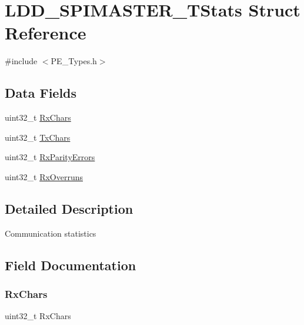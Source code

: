 \hypertarget{struct_l_d_d___s_p_i_m_a_s_t_e_r___t_stats}{}\section{L\+D\+D\+\_\+\+S\+P\+I\+M\+A\+S\+T\+E\+R\+\_\+\+T\+Stats Struct Reference}
\label{struct_l_d_d___s_p_i_m_a_s_t_e_r___t_stats}


{\ttfamily \#include $<$P\+E\+\_\+\+Types.\+h$>$}

\subsection*{Data Fields}
\begin{DoxyCompactItemize}
\item 
uint32\+\_\+t \hyperlink{struct_l_d_d___s_p_i_m_a_s_t_e_r___t_stats_a95ff5c4048db62e6b700f6060c77c523}{Rx\+Chars}
\item 
uint32\+\_\+t \hyperlink{struct_l_d_d___s_p_i_m_a_s_t_e_r___t_stats_a13ec7f90be6f667d1b98595eb709ccc7}{Tx\+Chars}
\item 
uint32\+\_\+t \hyperlink{struct_l_d_d___s_p_i_m_a_s_t_e_r___t_stats_a30956a47d75d5c7305f1f9f7c0d70621}{Rx\+Parity\+Errors}
\item 
uint32\+\_\+t \hyperlink{struct_l_d_d___s_p_i_m_a_s_t_e_r___t_stats_a45862235648738550a10ad79292ef50c}{Rx\+Overruns}
\end{DoxyCompactItemize}


\subsection{Detailed Description}
Communication statistics 

\subsection{Field Documentation}
\mbox{\label{struct_l_d_d___s_p_i_m_a_s_t_e_r___t_stats_a95ff5c4048db62e6b700f6060c77c523}} 
\subsubsection{\texorpdfstring{Rx\+Chars}{RxChars}}
{\footnotesize\ttfamily uint32\+\_\+t Rx\+Chars}

